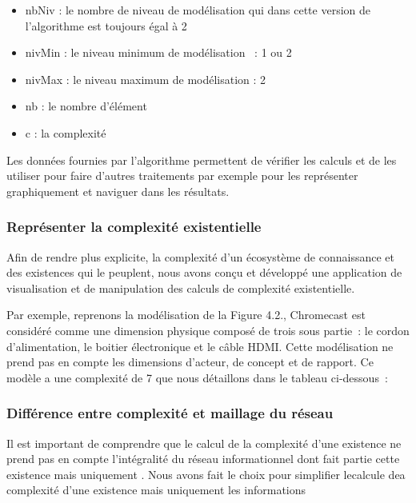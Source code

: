 \documentclass[
  letterpaper,
  DIV=11,
  numbers=noendperiod]{scrreprt}
\providecommand{\tightlist}{%
  \setlength{\itemsep}{0pt}\setlength{\parskip}{0pt}}\usepackage{longtable,booktabs,array}
\begin{document}
\begin{itemize}
  \begin{itemize}
  \tightlist
  \item
    nbNiv : le nombre de niveau de modélisation qui dans cette version
    de l'algorithme est toujours égal à 2
  \item
    nivMin : le niveau minimum de modélisation ~: 1 ou 2
  \item
    nivMax : le niveau maximum de modélisation : 2
  \item
    nb : le nombre d'élément
  \item
    c : la complexité
  \end{itemize}
\end{itemize}

Les données fournies par l'algorithme permettent de vérifier les calculs
et de les utiliser pour faire d'autres traitements par exemple pour les
représenter graphiquement et naviguer dans les résultats.

\hypertarget{repruxe9senter-la-complexituxe9-existentielle}{%
\subsubsection{Représenter la complexité
existentielle}\label{repruxe9senter-la-complexituxe9-existentielle}}

Afin de rendre plus explicite, la complexité d'un écosystème de
connaissance et des existences qui le peuplent, nous avons conçu et
développé une application de visualisation et de manipulation des
calculs de complexité existentielle.

Par exemple, reprenons la modélisation de la Figure 4.2., Chromecast est
considéré comme une dimension physique composé de trois sous partie~: le
cordon d'alimentation, le boitier électronique et le câble HDMI. Cette
modélisation ne prend pas en compte les dimensions d'acteur, de concept
et de rapport. Ce modèle a une complexité de 7 que nous détaillons dans
le tableau ci-dessous~:

\hypertarget{diffuxe9rence-entre-complexituxe9-et-maillage-du-ruxe9seau}{%
\subsubsection{Différence entre complexité et maillage du
réseau}\label{diffuxe9rence-entre-complexituxe9-et-maillage-du-ruxe9seau}}

Il est important de comprendre que le calcul de la complexité d'une
existence ne prend pas en compte l'intégralité du réseau informationnel
dont fait partie cette existence mais uniquement . Nous avons fait le
choix pour simplifier lecalcule dea complexité d'une existence mais
uniquement les informations
\end{document}
